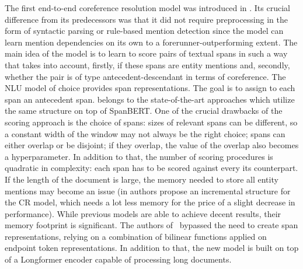 The first end-to-end coreference resolution model was introduced in \cite{cr-Lee17}. Its crucial difference from its predecessors was that it did not require preprocessing in the form of syntactic parsing or rule-based mention detection since the model can learn mention dependencies on its own to a forerunner-outperforming extent. 
The main idea of the model is to learn to score pairs of textual spans in such a way that takes into account, firstly, if these spans are entity mentions and, secondly, whether the pair is of type antecedent-descendant in terms of coreference.
The NLU model of choice provides span representations. 
The goal is to assign to each span an antecedent span. 
\cite{cr-Joshi2019} belongs to the state-of-the-art approaches which utilize the same structure on top of SpanBERT. 
One of the crucial drawbacks of the scoring approach is the choice of spans: sizes of relevant spans can be different, so a constant width of the window may not always be the right choice; spans can either overlap or be disjoint; if they overlap, the value of the overlap also becomes a hyperparameter. 
In addition to that, the number of scoring procedures is quadratic in complexity: each span has to be scored against every its counterpart. 
If the length of the document is large, the memory needed to store all entity mentions may become an issue (in \cite{cr-Xia2020} authors propose an incremental structure for the CR model, which needs a lot less memory for the price of a slight decrease in performance).
While previous models are able to achieve decent results, their memory footprint is significant. 
The authors of~\cite{Kirstain2021S2E} bypassed the need to create span representations, relying on a combination of bilinear functions applied on endpoint token representations. 
In addition to that, the new model is built on top of a Longformer encoder capable of processing long documents. 

